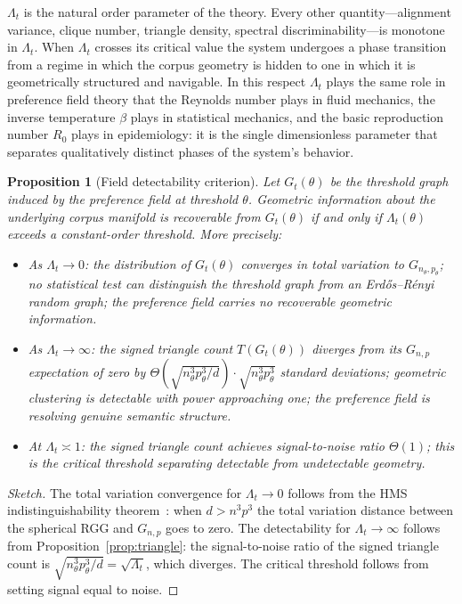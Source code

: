 \documentclass[12pt, a4paper]{article}
\theoremstyle{plain}
\newtheorem{proposition}{Proposition}[section]
\theoremstyle{definition}
\begin{document}
$\Lambda_t$ is the natural order parameter of the theory. Every other
quantity---alignment variance, clique number, triangle density, spectral
discriminability---is monotone in $\Lambda_t$. When $\Lambda_t$ crosses its
critical value the system undergoes a phase transition from a regime in which
the corpus geometry is hidden to one in which it is geometrically structured
and navigable. In this respect $\Lambda_t$ plays the same role in preference
field theory that the Reynolds number plays in fluid mechanics, the inverse
temperature $\beta$ plays in statistical mechanics, and the basic reproduction
number $R_0$ plays in epidemiology: it is the single dimensionless parameter
that separates qualitatively distinct phases of the system's behavior.

\begin{proposition}[Field detectability criterion]
\label{prop:detectability}
Let $G_t(\theta)$ be the threshold graph induced by the preference field at
threshold $\theta$. Geometric information about the underlying corpus manifold
is recoverable from $G_t(\theta)$ if and only if $\Lambda_t(\theta)$ exceeds
a constant-order threshold. More precisely:
\begin{itemize}
  \item As $\Lambda_t \to 0$: the distribution of $G_t(\theta)$ converges
    in total variation to $G_{n_\theta, p_\theta}$; no statistical test can
    distinguish the threshold graph from an Erd\H{o}s--R\'enyi random graph;
    the preference field carries no recoverable geometric information.
  \item As $\Lambda_t \to \infty$: the signed triangle count
    $T(G_t(\theta))$ diverges from its $G_{n,p}$ expectation of zero by
    $\Theta(\sqrt{n_\theta^3 p_\theta^3 / d}) \cdot \sqrt{n_\theta^3
    p_\theta^3}$ standard deviations; geometric clustering is detectable
    with power approaching one; the preference field is resolving genuine
    semantic structure.
  \item At $\Lambda_t \asymp 1$: the signed triangle count achieves
    signal-to-noise ratio $\Theta(1)$; this is the critical threshold
    separating detectable from undetectable geometry.
\end{itemize}
\end{proposition}

\begin{proof}[Sketch]
The total variation convergence for $\Lambda_t \to 0$ follows from the
HMS indistinguishability theorem~\cite{hunter2026gaussian}: when $d >
n^3 p^3$ the total variation distance between the spherical RGG and
$G_{n,p}$ goes to zero. The detectability for $\Lambda_t \to \infty$
follows from Proposition~\ref{prop:triangle}: the signal-to-noise ratio
of the signed triangle count is $\sqrt{n_\theta^3 p_\theta^3 / d} =
\sqrt{\Lambda_t}$, which diverges. The critical threshold follows from
setting signal equal to noise.
\end{proof}
\end{document}
